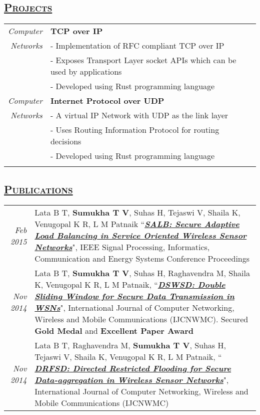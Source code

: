 \documentclass[14pt]{article}
\begin{document}
\subsection* {\scshape\Large\uline {Projects}}
\begin{tabularx}{\textwidth}{r X}
\emph{Computer} & \textbf{TCP over IP} \\
\emph{Networks} &  - Implementation of RFC compliant TCP over IP\\
                             & - Exposes Transport Layer socket APIs which can be used by applications\\
                             & - Developed using Rust programming language \\

\emph{Computer} & \textbf{Internet Protocol over UDP} \\
\emph{Networks} & - A virtual IP Network with UDP as the link layer\\
                             & - Uses Routing Information Protocol for routing decisions\\
                             & - Developed using Rust programming language\\
\\
\end{tabularx}


\subsection* {\scshape\Large\uline {Publications}}
\begin{tabularx}{\textwidth}{r X}
\emph{Feb 2015} & Lata B T, \textbf{Sumukha T V}, Suhas H, Tejaswi V, Shaila K, Venugopal K R, L M Patnaik ``\textbf{\textit{\href{http://ieeexplore.ieee.org/document/7091379/}{SALB: Secure Adaptive Load Balancing in Service Oriented Wireless Sensor Networks}}}",  IEEE Signal Processing, Informatics, Communication and Energy Systems Conference Proceedings \\ 
\emph{Nov 2014} & Lata B T, \textbf{Sumukha T V}, Suhas H, Raghavendra M, Shaila K, Venugopal K R, L M Patnaik, ``\textbf{\textit{\href{http://www.worldresearchlibrary.org/up_proc/pdf/2-141905888216-21.pdf}{DSWSD: Double Sliding Window for Secure Data Transmission in WSNs}}}", International Journal of Computer Networking, Wireless and Mobile Communications (IJCNWMC). Secured \textbf{Gold Medal} and \textbf{Excellent Paper Award} \\ 
\emph{Nov 2014} & Lata B T, Raghavendra M,  \textbf{Sumukha T V}, Suhas H, Tejaswi V, Shaila K, Venugopal K R, L M Patnaik, `` \textbf{\textit{\href{http://www.worldresearchlibrary.org/up_proc/pdf/2-141906057250-55.pdf}{DRFSD: Directed Restricted Flooding for Secure Data-aggregation in Wireless Sensor Networks}}}", International Journal of Computer Networking, Wireless and Mobile Communications (IJCNWMC)
\end{tabularx}
\end{document}
